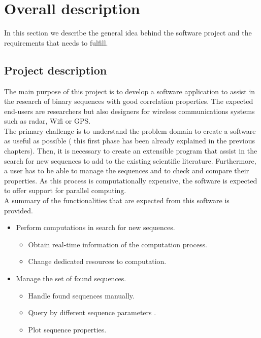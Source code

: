 \section{Overall description}

  In this section we describe the  general idea behind the software project  and the requirements that needs to fulfill.
  \subsection{Project description}

  The main purpose of this project is to develop a software application to assist
  in the research of binary sequences with good correlation properties. The expected
  end-users are researchers but also designers for wireless communications systems
  such as radar, Wifi or GPS.\\

  The primary challenge is to understand the problem domain to create a software
  as useful as possible ( this first phase has been already explained in the
  previous chapters). Then, it is necessary to create an extensible program that
  assist in the search for new sequences to add to the existing scientific
  literature. Furthermore, a user has to be able to manage the sequences and to
  check and compare their properties. As this process is computationally
  expensive, the software is expected to offer support for parallel computing.\\


A summary of the functionalities that are expected from
  this software is provided.

  \begin{itemize}
    \item Perform computations in search for new sequences.\\
            \begin{itemize}
              \item Obtain real-time information of the computation process.
              \item Change dedicated resources to computation.
            \end{itemize}
    \item Manage the set of found sequences.
            \begin{itemize}
              \item Handle found sequences manually.
              \item Query by different sequence parameters .
              \item Plot sequence properties.
            \end{itemize}
  \end{itemize}


